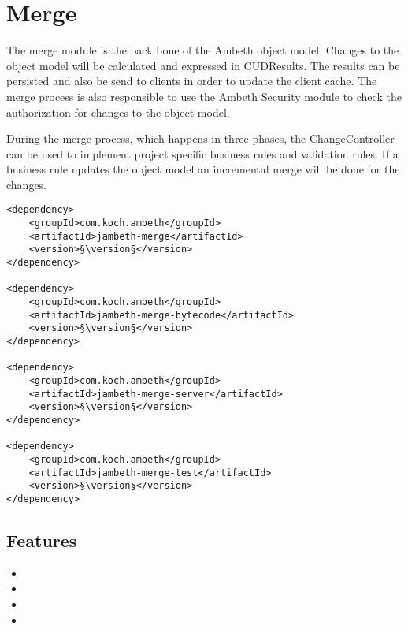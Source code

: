 \section{Merge}
\label{module:Merge}
\ClearAPI
The merge module is the back bone of the Ambeth object model. Changes to the object model will be calculated and expressed in CUDResults. The results can be persisted and also be send to clients in order to update the client cache. The merge process is also responsible to use the Ambeth Security module to check the authorization for changes to the object model.

During the merge process, which happens in three phases, the ChangeController can be used to implement project specific business rules and validation rules. If a business rule updates the object model an incremental merge will be done for the changes.

\TODO

\begin{lstlisting}[style=POM,caption={Maven modules to use \emph{Ambeth Merge}}]
<dependency>
	<groupId>com.koch.ambeth</groupId>
	<artifactId>jambeth-merge</artifactId>
	<version>§\version§</version>
</dependency>

<dependency>
	<groupId>com.koch.ambeth</groupId>
	<artifactId>jambeth-merge-bytecode</artifactId>
	<version>§\version§</version>
</dependency>

<dependency>
	<groupId>com.koch.ambeth</groupId>
	<artifactId>jambeth-merge-server</artifactId>
	<version>§\version§</version>
</dependency>

<dependency>
	<groupId>com.koch.ambeth</groupId>
	<artifactId>jambeth-merge-test</artifactId>
	<version>§\version§</version>
</dependency>
\end{lstlisting}
\subsection{Features}
\begin{itemize}
	\item {}
	\item {}
	\item {}
	\item {}
\end{itemize}

